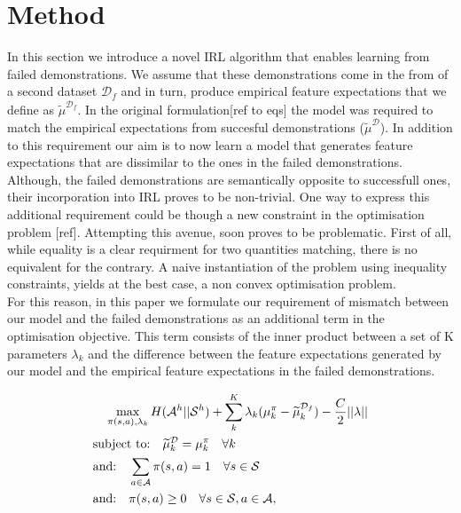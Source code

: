 \documentclass[letterpaper]{article}
\begin{document}
\section{Method}
	In this section we introduce a novel IRL algorithm that enables learning from failed demonstrations. We assume that these demonstrations come in the from of a second dataset $\mathcal{D}_f$ and in turn, produce empirical feature expectations that we define as $\widetilde{\mu}^{\mathcal{D}_f}$. 
	In the original formulation[ref to eqs] the model was required to match the empirical expectations from succesful demonstrations ($\widetilde{\mu}^{\mathcal{D}}$). In addition to this requirement 
	our aim is to now learn a model that generates feature expectations that are dissimilar to the ones in the failed demonstrations.  
	Although, the failed demonstrations are semantically opposite to successfull ones, their incorporation into IRL proves to be non-trivial.
	One way to express this additional requirement could be though a new constraint in the optimisation problem [ref]. Attempting this avenue, soon proves to be problematic. First of all, while equality is a clear requirment for two quantities matching, there is no equivalent for the contrary. A naive instantiation of the problem using inequality constraints, yields at the best case, a non convex optimisation problem.\\
	For this reason, in this paper we formulate our requirement of mismatch between our model and the failed demonstrations as an additional term in the optimisation objective. This term consists of the inner product between a set of K parameters $\lambda_k$ and the difference between the feature expectations generated by our model and the empirical feature expectations in the failed demonstrations. 


\begin{align}
 &\quad\max\limits_{\pi(s,a),\lambda_k} H(\mathcal{A}^h||\mathcal{S}^h) + \sum_k^K \lambda_k (\mu_k^{\pi} -\widetilde{\mu}_k^{\mathcal{D}_f}) - \frac{C}{2}||\mathbf{\lambda}|| \label{eq:primal_obj_failure}\\
&\hbox{subject to:}\quad\widetilde{\mu}^{\mathcal{D}}_k   = \mu^{\pi}_k\quad\forall k \label{eq:features_equality_constraint_failure}\\
&\hbox{and:} \quad\sum_{a\in\mathcal{A}}\pi(s,a)  = 1\quad\forall s\in\mathcal{S}\\
&\hbox{and:} \quad\pi(s,a) \geq 0\quad\forall s\in\mathcal{S},a\in\mathcal{A},  
\end{align}
\end{document}

